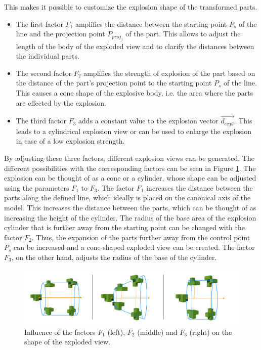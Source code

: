 This makes it possible to customize the explosion shape of the transformed parts.
\begin{itemize}
	\item The first factor $F_1$ amplifies the distance between the starting point $P_s$ of the line and the projection point $P_{proj_j}$ of the part. 
	This allows to adjust the length of the body of the exploded view and to clarify the distances between the individual parts.  
	\item The second factor $F_2$ amplifies the strength of explosion of the part based on the distance of the part's projection point to the starting point $P_s$ of the line. 
	This causes a cone shape of the explosive body, i.e. the area where the parts are effected by the explosion.
	\item The third factor $F_3$ adds a constant value to the explosion vector $\vec{d_{expl}}$. 
	This leads to a cylindrical explosion view or can be used to enlarge the explosion in case of a low explosion strength.  
\end{itemize}
By adjusting these three factors, different explosion views can be generated. The different possibilities with the corresponding factors can be seen in Figure \ref{fig:LineExplosionFactors}.
The explosion can be thought of as a cone or a cylinder, whose shape can be adjusted using the parameters $F_1$ to $F_3$.
The factor $F_1$ increases the distance between the parts along the defined line, which ideally is placed on the canonical axis of the model. This increases the distance between the parts, which can be thought of as increasing the height of the cylinder.
The radius of the base area of the explosion cylinder that is further away from the starting point can be changed with the factor $F_2$. Thus, the expansion of the parts further away from the control point $P_s$ can be increased and a cone-shaped exploded view can be created. 
The factor $F_3$, on the other hand, adjusts the radius of the base of the cylinder.
\begin{figure}[h]
	\centering
	\includegraphics[width=.9\linewidth]{fig/Images/LineExplosionFactors}
	\caption[]{Influence of the factors $F_1$ (left), $F_2$ (middle) and $F_3$ (right) on the shape of the exploded view.}
	\label{fig:LineExplosionFactors}
\end{figure}
